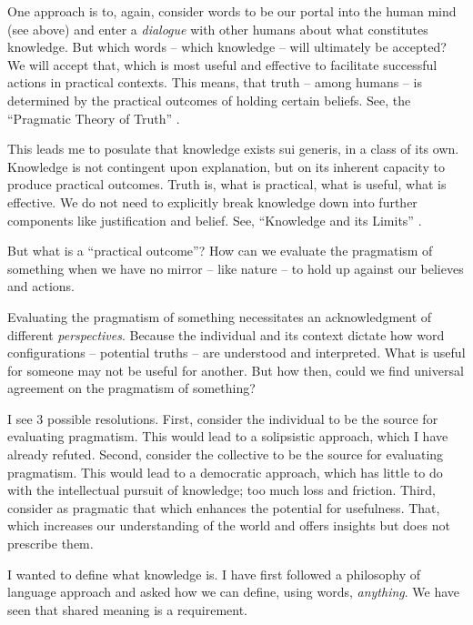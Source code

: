 One approach is to, again, consider words to be our portal into the human mind (see above) and enter a \textit{dialogue} with other humans about what constitutes knowledge.
But which words -- which knowledge -- will ultimately be accepted?
We will accept that, which is most useful and effective to facilitate successful actions in practical contexts.
This means, that truth -- among humans -- is determined by the practical outcomes of holding certain beliefs.
See, the \enquote{Pragmatic Theory of Truth} \parencite{capps-23}.

This leads me to posulate that knowledge exists sui generis, in a class of its own.
Knowledge is not contingent upon explanation, but on its inherent capacity to produce practical outcomes.
Truth is, what is practical, what is useful, what is effective.
We do not need to explicitly break knowledge down into further components like justification and belief.
See, \enquote{Knowledge and its Limits} \parencite{williamson-02}.

But what is a \enquote{practical outcome}?
How can we evaluate the pragmatism of something when we have no mirror -- like nature -- to hold up against our believes and actions.

\gap

Evaluating the pragmatism of something necessitates an acknowledgment of different \textit{perspectives}.
Because the individual and its context dictate how word configurations -- potential truths -- are understood and interpreted.
What is useful for someone may not be useful for another.
But how then, could we find universal agreement on the pragmatism of something?

I see 3 possible resolutions.
First, consider the individual to be the source for evaluating pragmatism.
This would lead to a solipsistic approach, which I have already refuted.
Second, consider the collective to be the source for evaluating pragmatism.
This would lead to a democratic approach, which has little to do with the intellectual pursuit of knowledge; too much loss and friction.
Third, consider as pragmatic that which enhances the potential for usefulness.
That, which increases our understanding of the world and offers insights but does not prescribe them.

\gap

I wanted to define what knowledge is.
I have first followed a philosophy of language approach and asked how we can define, using words, \textit{anything}.
We have seen that shared meaning is a requirement.

